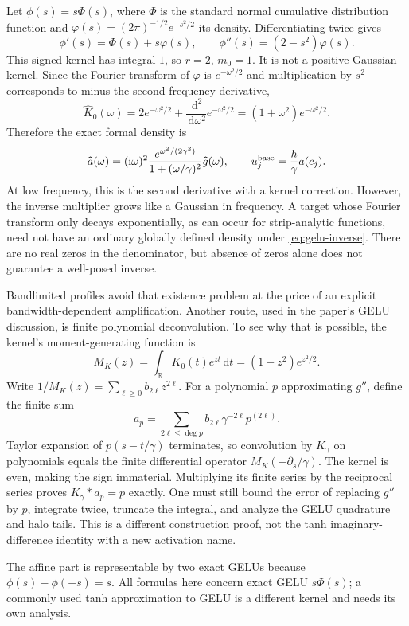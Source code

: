 \documentclass[11pt]{article}
\newcommand{\R}{\mathbb R}
\newcommand{\ii}{\mathrm i}
\newcommand{\dd}{\,\mathrm d}
\begin{document}
Let $\phi(s)=s\Phi(s)$, where $\Phi$ is the standard normal cumulative distribution function and $\varphi(s)=(2\pi)^{-1/2}e^{-s^2/2}$ its density. Differentiating twice gives
\[
 \phi'(s)=\Phi(s)+s\varphi(s),\qquad
 \phi''(s)=(2-s^2)\varphi(s).
\]
This signed kernel has integral $1$, so $r=2$, $m_0=1$. It is not a positive Gaussian kernel. Since the Fourier transform of $\varphi$ is $e^{-\omega^2/2}$ and multiplication by $s^2$ corresponds to minus the second frequency derivative,
\[
 \widehat K_0(\omega)=2e^{-\omega^2/2}
 +\frac{\dd^2}{\dd\omega^2}e^{-\omega^2/2}
 =(1+\omega^2)e^{-\omega^2/2}.
\]
Therefore the exact formal density is
\begin{equation}
 \widehat a(\omega)=(\ii\omega)^2
 \frac{e^{\omega^2/(2\gamma^2)}}{1+(\omega/\gamma)^2}
 \widehat g(\omega),\qquad
 u_j^{\rm base}=\frac h\gamma a(c_j).
 \label{eq:gelu-inverse}
\end{equation}
At low frequency, this is the second derivative with a kernel correction. However, the inverse multiplier grows like a Gaussian in frequency. A target whose Fourier transform only decays exponentially, as can occur for strip-analytic functions, need not have an ordinary globally defined density under \eqref{eq:gelu-inverse}. There are no real zeros in the denominator, but absence of zeros alone does not guarantee a well-posed inverse.

Bandlimited profiles avoid that existence problem at the price of an explicit bandwidth-dependent amplification. Another route, used in the paper's GELU discussion, is finite polynomial deconvolution. To see why that is possible, the kernel's moment-generating function is
\[
 M_K(z)=\int_\R K_0(t)e^{zt}\dd t=(1-z^2)e^{z^2/2}.
\]
Write $1/M_K(z)=\sum_{\ell\ge0}b_{2\ell}z^{2\ell}$. For a polynomial $p$ approximating $g''$, define the finite sum
\[
 a_p=\sum_{2\ell\le\deg p}b_{2\ell}\gamma^{-2\ell}p^{(2\ell)}.
\]
Taylor expansion of $p(s-t/\gamma)$ terminates, so convolution by $K_\gamma$ on polynomials equals the finite differential operator $M_K(-\partial_s/\gamma)$. The kernel is even, making the sign immaterial. Multiplying its finite series by the reciprocal series proves $K_\gamma*a_p=p$ exactly. One must still bound the error of replacing $g''$ by $p$, integrate twice, truncate the integral, and analyze the GELU quadrature and halo tails. This is a different construction proof, not the tanh imaginary-difference identity with a new activation name.

The affine part is representable by two exact GELUs because $\phi(s)-\phi(-s)=s$. All formulas here concern exact GELU $s\Phi(s)$; a commonly used tanh approximation to GELU is a different kernel and needs its own analysis.
\end{document}
